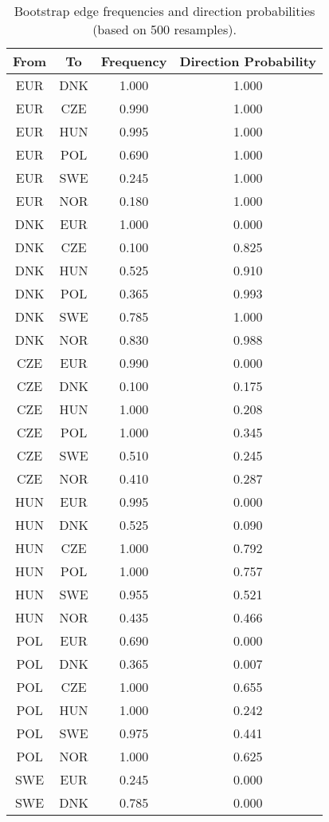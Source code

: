\begin{table}[!h]
\centering
\caption{Bootstrap edge frequencies and direction probabilities (based on 500 resamples).}
\centering
\begin{tabular}[t]{cccc}
\toprule
From & To & Frequency & Direction Probability\\
\midrule
EUR & DNK & 1.000 & 1.000\\
EUR & CZE & 0.990 & 1.000\\
EUR & HUN & 0.995 & 1.000\\
EUR & POL & 0.690 & 1.000\\
EUR & SWE & 0.245 & 1.000\\
\addlinespace
EUR & NOR & 0.180 & 1.000\\
DNK & EUR & 1.000 & 0.000\\
DNK & CZE & 0.100 & 0.825\\
DNK & HUN & 0.525 & 0.910\\
DNK & POL & 0.365 & 0.993\\
\addlinespace
DNK & SWE & 0.785 & 1.000\\
DNK & NOR & 0.830 & 0.988\\
CZE & EUR & 0.990 & 0.000\\
CZE & DNK & 0.100 & 0.175\\
CZE & HUN & 1.000 & 0.208\\
\addlinespace
CZE & POL & 1.000 & 0.345\\
CZE & SWE & 0.510 & 0.245\\
CZE & NOR & 0.410 & 0.287\\
HUN & EUR & 0.995 & 0.000\\
HUN & DNK & 0.525 & 0.090\\
\addlinespace
HUN & CZE & 1.000 & 0.792\\
HUN & POL & 1.000 & 0.757\\
HUN & SWE & 0.955 & 0.521\\
HUN & NOR & 0.435 & 0.466\\
POL & EUR & 0.690 & 0.000\\
\addlinespace
POL & DNK & 0.365 & 0.007\\
POL & CZE & 1.000 & 0.655\\
POL & HUN & 1.000 & 0.242\\
POL & SWE & 0.975 & 0.441\\
POL & NOR & 1.000 & 0.625\\
\addlinespace
SWE & EUR & 0.245 & 0.000\\
SWE & DNK & 0.785 & 0.000\\

\end{tabular}
\end{table}
